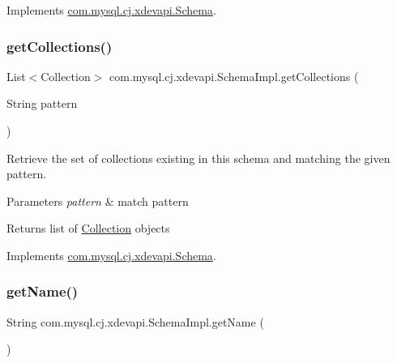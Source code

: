 Implements \mbox{\hyperlink{interfacecom_1_1mysql_1_1cj_1_1xdevapi_1_1_schema_a644344cb0eaa8ea239f7b82443c487ec}{com.\+mysql.\+cj.\+xdevapi.\+Schema}}.

\mbox{\label{classcom_1_1mysql_1_1cj_1_1xdevapi_1_1_schema_impl_a9a4dc1d12f1d8240c4b6bc114565b191}} 
\subsubsection{\texorpdfstring{get\+Collections()}{getCollections()}\hspace{0.1cm}{\footnotesize\ttfamily [2/2]}}
{\footnotesize\ttfamily List$<$Collection$>$ com.\+mysql.\+cj.\+xdevapi.\+Schema\+Impl.\+get\+Collections (\begin{DoxyParamCaption}\item[{String}]{pattern }\end{DoxyParamCaption})}

Retrieve the set of collections existing in this schema and matching the given pattern.


\begin{DoxyParams}{Parameters}
{\em pattern} & match pattern \\
\hline
\end{DoxyParams}
\begin{DoxyReturn}{Returns}
list of \mbox{\hyperlink{interfacecom_1_1mysql_1_1cj_1_1xdevapi_1_1_collection}{Collection}} objects 
\end{DoxyReturn}


Implements \mbox{\hyperlink{interfacecom_1_1mysql_1_1cj_1_1xdevapi_1_1_schema_ac569085a3e372ef1db5f65f3a9e644ce}{com.\+mysql.\+cj.\+xdevapi.\+Schema}}.

\mbox{\label{classcom_1_1mysql_1_1cj_1_1xdevapi_1_1_schema_impl_aab6a1ee96f0abeacc922a36da272e50d}} 
\subsubsection{\texorpdfstring{get\+Name()}{getName()}}
{\footnotesize\ttfamily String com.\+mysql.\+cj.\+xdevapi.\+Schema\+Impl.\+get\+Name (\begin{DoxyParamCaption}{ }\end{DoxyParamCaption})}

